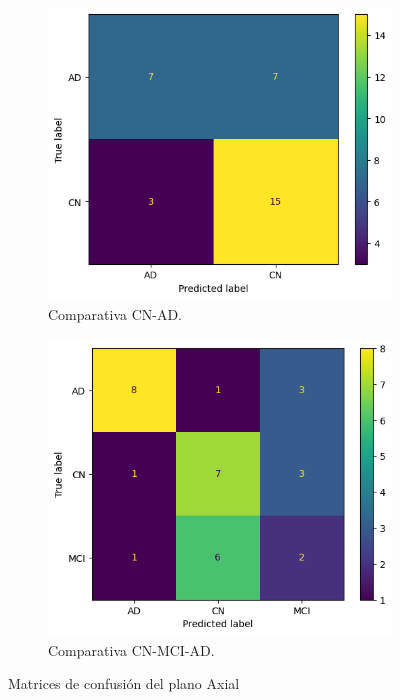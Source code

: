 \begin{figure}[H]
    \centering
    \begin{subfigure}{0.45\textwidth}
        \includegraphics[width=\textwidth]{./imgs/resultados/axial/CN_AD_cm_AXIAL}
        \caption{Comparativa CN-AD. }
        \label{fig:mc-axial-cn-ad}
    \end{subfigure}
    \hspace*{\fill}
    \begin{subfigure}{0.45\textwidth}
        \includegraphics[width=\textwidth]{./imgs/resultados/axial/CN_MCI_AD_cm_AXIAL}
        \caption{Comparativa CN-MCI-AD. }
        \label{fig:mc-axial-cn-mci-ad}
    \end{subfigure}
    \caption{Matrices de confusión del plano Axial} \label{fig:mc-axial}
\end{figure}

